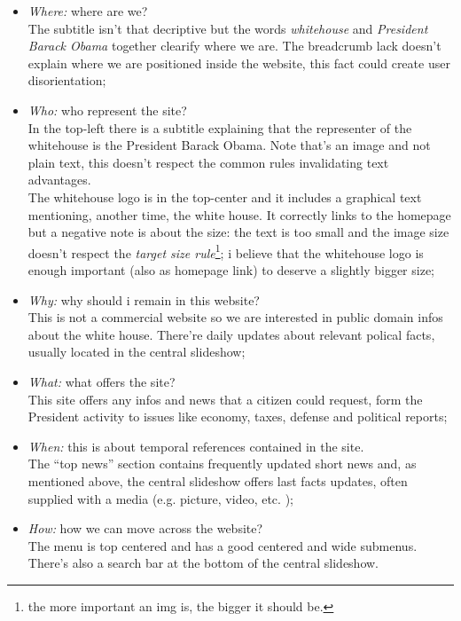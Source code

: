 \documentclass[
12pt, %
a4paper, %
oneside, %
headinclude,footinclude, %
BCOR5mm, %
]{scrartcl}
\begin{document}
\begin{itemize}%
	\item \textit{Where:} where are we? \\ The subtitle isn't that decriptive but the words \emph{whitehouse} and \emph{President Barack Obama} together clearify where we are. The breadcrumb lack doesn't explain where we are positioned inside the website, this fact could create user disorientation;

	\item \textit{Who:} who represent the site? \\ In the top-left there is a subtitle explaining that the representer of the whitehouse is the President Barack Obama. Note that's an image and not plain text, this doesn't respect the common rules invalidating text advantages. \\
	The whitehouse logo is in the top-center and it includes a graphical text mentioning, another time, the white house. It correctly links to the homepage but a negative note is about the size: the text is too small and the image size doesn't respect the \emph{target size rule}\footnote{the more important an img is, the bigger it should be.}; i believe that the whitehouse logo is enough important (also as homepage link) to deserve a slightly bigger size;

	\item \textit{Why:} why should i remain in this website? \\ This is not a commercial website so we are interested in public domain infos about the white house. There're daily updates about relevant polical facts, usually located in the central slideshow;

	\item \textit{What:} what offers the site? \\ This site offers any infos and news that a citizen could request, form the President activity to issues like economy, taxes, defense and political reports;

	\item \textit{When:} this is about temporal references contained in the site. \\ The ``top news'' section contains frequently updated short news and, as mentioned above, the central slideshow offers last facts updates, often supplied with a media (e.g. picture, video, etc. ); 

	\item \textit{How:} how we can move across the website? \\ The menu is top centered and has a good centered and wide submenus. There's also a search bar at the bottom of the central slideshow.

\end{itemize}
\end{document}

